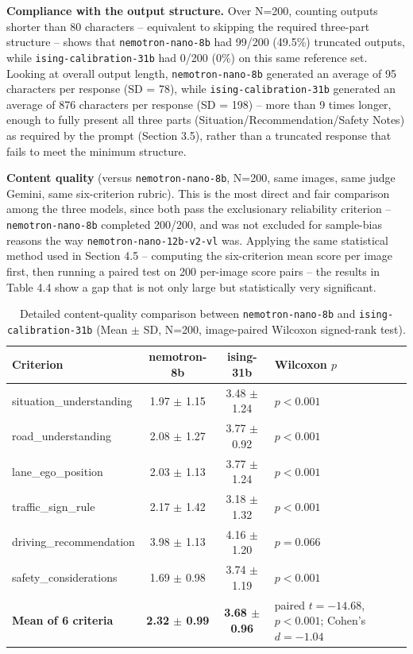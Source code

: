 \documentclass[12pt,a4paper]{report}
\begin{document}
\textbf{Compliance with the output structure.} Over N=200, counting outputs shorter than 80 characters -- equivalent to skipping the required three-part structure -- shows that \texttt{nemotron-nano-8b} had 99/200 (49.5\%) truncated outputs, while \texttt{ising-calibration-31b} had 0/200 (0\%) on this same reference set. Looking at overall output length, \texttt{nemotron-nano-8b} generated an average of 95 characters per response (SD = 78), while \texttt{ising-calibration-31b} generated an average of 876 characters per response (SD = 198) -- more than 9 times longer, enough to fully present all three parts (Situation/Recommendation/Safety Notes) as required by the prompt (Section 3.5), rather than a truncated response that fails to meet the minimum structure.

\textbf{Content quality} (versus \texttt{nemotron-nano-8b}, N=200, same images, same judge Gemini, same six-criterion rubric). This is the most direct and fair comparison among the three models, since both pass the exclusionary reliability criterion -- \texttt{nemotron-nano-8b} completed 200/200, and was not excluded for sample-bias reasons the way \texttt{nemotron-nano-12b-v2-vl} was. Applying the same statistical method used in Section 4.5 -- computing the six-criterion mean score per image first, then running a paired test on 200 per-image score pairs -- the results in Table 4.4 show a gap that is not only large but statistically very significant.

\begin{table}[htbp]
    \centering
    \footnotesize
    \caption{Detailed content-quality comparison between \texttt{nemotron-nano-8b} and \texttt{ising-calibration-31b} (Mean $\pm$ SD, N=200, image-paired Wilcoxon signed-rank test).}
    \label{tab:4.4}
    \begin{tabular}{@{}p{3.4cm}cc p{3.6cm}@{}}
        \toprule
        \textbf{Criterion} & \textbf{nemotron-8b} & \textbf{ising-31b} & \textbf{Wilcoxon $p$} \\
        \midrule
        situation\_understanding  & 1.97 $\pm$ 1.15 & 3.48 $\pm$ 1.24 & $p<0.001$ \\
        road\_understanding       & 2.08 $\pm$ 1.27 & 3.77 $\pm$ 0.92 & $p<0.001$ \\
        lane\_ego\_position       & 2.03 $\pm$ 1.13 & 3.77 $\pm$ 1.24 & $p<0.001$ \\
        traffic\_sign\_rule       & 2.17 $\pm$ 1.42 & 3.18 $\pm$ 1.32 & $p<0.001$ \\
        driving\_recommendation   & 3.98 $\pm$ 1.13 & 4.16 $\pm$ 1.20 & $p=0.066$ \\
        safety\_considerations    & 1.69 $\pm$ 0.98 & 3.74 $\pm$ 1.19 & $p<0.001$ \\
        \textbf{Mean of 6 criteria} & \textbf{2.32 $\pm$ 0.99} & \textbf{3.68 $\pm$ 0.96} & paired $t=-14.68$, $p<0.001$; Cohen's $d=-1.04$ \\
        \bottomrule
    \end{tabular}
\end{table}
\end{document}
